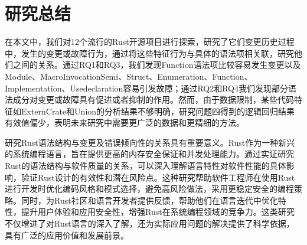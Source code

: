 \chapter{研究总结}
在本文中，我们对12个流行的Rust开源项目进行探索，研究了它们变更历史过程中，发生的变更或故障行为，通过将这些特征行为与具体的语法项相关联，研究他们之间的关系。通过RQ1和RQ3，我们发现Function语法项比较容易发生变更以及Module、MacroInvocationSemi、Struct、Enumeration、Function、Implementation、Usedeclaration容易引发故障；通过RQ2和RQ4我们发现部分语法成分对变更或故障具有促进或者抑制的作用。然而，由于数据限制，某些代码特征如ExternCrate和Union的分析结果不够明确，研究问题四得到的逻辑回归结果有效值偏少，表明未来研究中需要更广泛的数据和更精细的方法。

研究Rust语法结构与变更及错误倾向性的关系具有重要意义。Rust作为一种新兴的系统编程语言，旨在提供更高的内存安全保证和并发处理能力。通过实证研究Rust的语法结构与软件质量的关系，可以深入理解语言特性对软件性能的具体影响，验证Rust设计的有效性和潜在风险点。这种研究帮助软件工程师在使用Rust进行开发时优化编码风格和模式选择，避免高风险做法，采用更稳定安全的编程策略。同时，为Rust社区和语言开发者提供反馈，帮助他们在语言迭代中优化特性，提升用户体验和应用安全性，增强Rust在系统编程领域的竞争力。这类研究不仅增进了对Rust语言的深入了解，还为实际应用问题的解决提供了科学依据，具有广泛的应用价值和发展前景。
